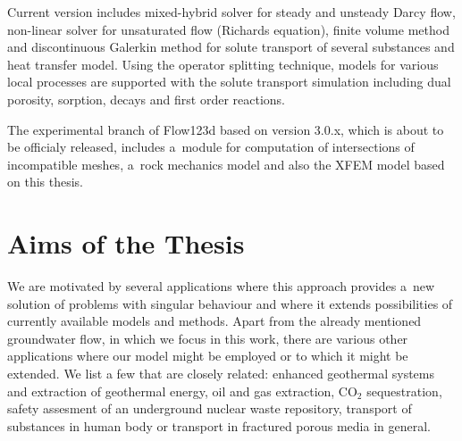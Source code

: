 Current version includes mixed-hybrid solver for steady and unsteady Darcy flow, non-linear solver for unsaturated flow (Richards equation),
finite volume method and discontinuous Galerkin method for solute transport of several substances and heat transfer model. 
Using the operator splitting technique, models for various local processes are supported with the solute transport simulation
including dual porosity, sorption, decays and first order reactions.

The experimental branch of Flow123d based on version 3.0.x, which is about to be officialy released,
includes a~module for computation of intersections of incompatible meshes,
a~rock mechanics model and also the XFEM model based on this thesis.






\section{Aims of the Thesis}\label{chap:aims}

We are motivated by several applications where this approach provides a~new solution of problems with singular behaviour
and where it extends possibilities of currently available models and methods.
Apart from the already mentioned groundwater flow, in which we focus in this work, there are various other applications
where our model might be employed or to which it might be extended.
We list a few that are closely related: enhanced geothermal systems and extraction of geothermal energy,
oil and gas extraction, CO$_2$ sequestration, safety assesment of an underground nuclear waste repository,
transport of substances in human body or transport in fractured porous media in general.

